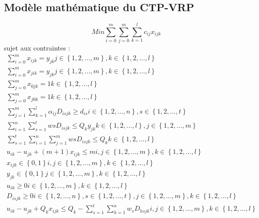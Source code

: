 \documentclass[12pt, a4paper, onecolumn, twoside,french,cleardoublepage=plain,openany]{article}
\begin{document}
\subsection{Modèle mathématique du CTP-VRP}\label{modele_ctp_vrp}
\begin{equation}
Min \sum_{i=0}^{m}\sum_{j=0}^{m}\sum_{k=1}^{l}c_{ij}x_{ijk}
\end{equation}
sujet aux contraintes :
\begin{gather}
\sum_{i=0}^{m}x_{ijk} = y_{jk}   j\in\left\{1,2,...,m\right\}, k\in\left\{1,2,...,l\right\} \\ 
\sum_{i=0}^{m}x_{jik} = y_{jk}   j\in\left\{1,2,...,m\right\}, k\in\left\{1,2,...,l\right\} \\ 
\sum_{j=0}^{m}x_{0jk} = 1   k\in\left\{1,2,...,l\right\} \\ 
\sum_{j=0}^{m}x_{j0k} = 1   k\in\left\{1,2,...,l\right\} \\
\sum_{j=1}^{m}\sum_{k=1}^{l}\alpha_{ij}D_{isjk} \geq d_{is}    i\in\left\{1,2,...,n\right\}, s\in\left\{1,2,...,t\right\} \\
\sum_{i=1}^{n}\sum_{s=1}^{t}w{s}D_{isjk} \leq Q_{k}y_{jk}    k\in\left\{1,2,...,l\right\}, j\in\left\{1,2,...,m\right\} \\
\sum_{s=1}^{t}\sum_{i=1}^{n}\sum_{j=1}^{m}w{s}D_{isjk} \leq Q_{k}    k\in\left\{1,2,...,l\right\} \\
u_{ik} - u_{jk} + (m + 1)x_{ijk} \leq m   i,j\in\left\{1,2,...,m\right\}, k\in\left\{1,2,...,l\right\} \\
x_{ijk} \in\left\{0,1\right\}   i,j\in\left\{1,2,...,m\right\}, k\in\left\{1,2,...,l\right\} \\
y_{jk} \in\left\{0,1\right\}   j\in\left\{1,2,...,m\right\}, k\in\left\{1,2,...,l\right\}\\ 
u_{ik} \geq 0   i\in\left\{1,2,...,m\right\}, k\in\left\{1,2,...,l\right\}\\ 
D_{isjk} \geq 0   i\in\left\{1,2,...,n\right\}, s\in\left\{1,2,...,t\right\}, j\in\left\{1,2,...,m\right\}, k\in\left\{1,2,...,l\right\}\\ 
u_{ik} - u_{jk} + Q_{k}x_{ijk} \leq Q_{k} - \sum_{s=1}^{t}\sum_{h=1}^{n}w_{s}D_{hsjk}   i,j\in\left\{1,2,...,m\right\}, k\in\left\{1,2,...,l\right\} \\
\end{gather}
\end{document}
